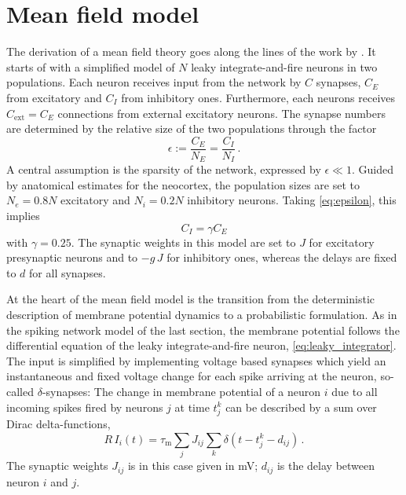 \FloatBarrier
\section{Mean field model}
The derivation of a mean field theory goes along the 
lines of the work by .
It starts of with a simplified model of 
$N$ leaky integrate-and-fire neurons in two populations. 
Each neuron receives input from the network by $C$ synapses, 
$C_E$ from excitatory and $C_I$ from inhibitory ones. 
Furthermore, each neurons receives $C_\text{ext} = C_E$ connections from 
external excitatory neurons.
The synapse numbers 
are determined by the relative size of the two populations through the factor
\begin{equation}
    \epsilon := \frac{C_E}{N_E} = \frac{C_I}{N_I} \,.
    \label{eq:epsilon}
\end{equation}
A central assumption is the sparsity of the network, expressed by $\epsilon \ll 1$.
Guided by anatomical estimates for the neocortex, the population sizes are set to
$N_e = 0.8N$ excitatory and $N_i = 0.2N$ inhibitory neurons. Taking \autoref{eq:epsilon}, 
this implies 
\begin{equation}
    C_I = \gamma C_E 	
 \label{eq:C_I}
\end{equation}
with $\gamma = 0.25$. The synaptic weights in this model are set to $J$ for 
excitatory presynaptic neurons and to $-g\, J$ for inhibitory ones, 
whereas the delays are fixed to $d$ for all synapses. 

At the heart of the mean field model
is the transition from the deterministic description of membrane potential 
dynamics to a probabilistic formulation. 
As in the spiking network model of the last section, the membrane potential follows
the differential equation of the leaky integrate-and-fire neuron, 
\autoref{eq:leaky_integrator}. The input is simplified 
by implementing voltage based synapses which
yield an instantaneous and fixed voltage change
for each spike arriving at the neuron, so-called $\delta$-synapses:
The change in membrane potential of a neuron $i$ due to all incoming spikes 
fired by neurons $j$ at time $t_j^k$ 
can be described by a sum over Dirac delta-functions, 
\begin{equation}
    R\,I_i(t) = \tau_\text{m} \sum_j J_{ij} \sum_k \delta(t - t_j^k - d_{ij}) \,.
    \label{eq:input_const_volt}
\end{equation}
The synaptic weights $J_{ij}$ is in this case given in mV; $d_{ij}$ is the delay 
between neuron $i$ and $j$.


